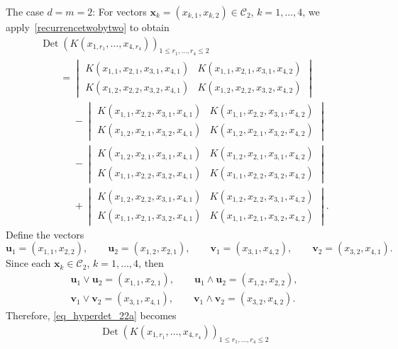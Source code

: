 \documentclass[pdftex]{sigma}
\numberwithin{equation}{section}
\def\Det{\operatorname{Det}}
\def\CC{\mathcal{C}}
\def\uu{\boldsymbol{u}}
\def\vv{\boldsymbol{v}}
\def\xx{\boldsymbol{x}}
\begin{document}
\begin{Example}
\label{classicalhtp}
The case $d = m = 2$: For vectors $\xx_k = (x_{k,1},x_{k,2}) \in \CC_2$, $k = 1,\dots,4$, we apply~\eqref{recurrencetwobytwo} to obtain
\begin{gather}
\Det(K(x_{1,r_1},\dots, x_{4,r_4}))_{1 \le r_1,\dots,r_4 \le 2} \nonumber \\
\qquad=
\begin{vmatrix}
K(x_{1,1},x_{2,1},x_{3,1},x_{4,1}) & K(x_{1,1},x_{2,1},x_{3,1},x_{4,2}) \\
K(x_{1,2},x_{2,2},x_{3,2},x_{4,1}) & K(x_{1,2},x_{2,2},x_{3,2},x_{4,2})
\end{vmatrix} \nonumber \\
\phantom{\qquad= }{} -
\begin{vmatrix}
K(x_{1,1},x_{2,2},x_{3,1},x_{4,1}) & K(x_{1,1},x_{2,2},x_{3,1},x_{4,2}) \\
K(x_{1,2},x_{2,1},x_{3,2},x_{4,1}) & K(x_{1,2},x_{2,1},x_{3,2},x_{4,2})
\end{vmatrix} \nonumber \\
\phantom{\qquad= }{} -
\begin{vmatrix}
K(x_{1,2},x_{2,1},x_{3,1},x_{4,1}) & K(x_{1,2},x_{2,1},x_{3,1},x_{4,2}) \\
K(x_{1,1},x_{2,2},x_{3,2},x_{4,1}) & K(x_{1,1},x_{2,2},x_{3,2},x_{4,2})
\end{vmatrix} \nonumber \\
\phantom{\qquad= }{} +
\begin{vmatrix}
K(x_{1,2},x_{2,2},x_{3,1},x_{4,1}) & K(x_{1,2},x_{2,2},x_{3,1},x_{4,2}) \\
K(x_{1,1},x_{2,1},x_{3,2},x_{4,1}) & K(x_{1,1},x_{2,1},x_{3,2},x_{4,2})
\end{vmatrix}.\label{eq_hyperdet_22a}
\end{gather}
Define the vectors
\[
\uu_1 = (x_{1,1},x_{2,2}), \qquad \uu_2 = (x_{1,2},x_{2,1}), \qquad
\vv_1 = (x_{3,1},x_{4,2}), \qquad \vv_2 = (x_{3,2},x_{4,1}).
\]
Since each $\xx_k \in \CC_2$, $k=1,\dots,4$, then
\begin{gather*}
\uu_1 \vee \uu_2 = (x_{1,1},x_{2,1}), \qquad \uu_1 \wedge \uu_2 = (x_{1,2},x_{2,2}), \\
\vv_1 \vee \vv_2 = (x_{3,1},x_{4,1}), \qquad \vv_1 \wedge \vv_2 = (x_{3,2},x_{4,2}).
\end{gather*}
Therefore, \eqref{eq_hyperdet_22a} becomes
\begin{gather}
\Det(K(x_{1,r_1},\dots, x_{4,r_4}))_{1 \le r_1,\dots,r_4 \le 2} \nonumber \\

\end{gather}
\end{Example}
\end{document}
